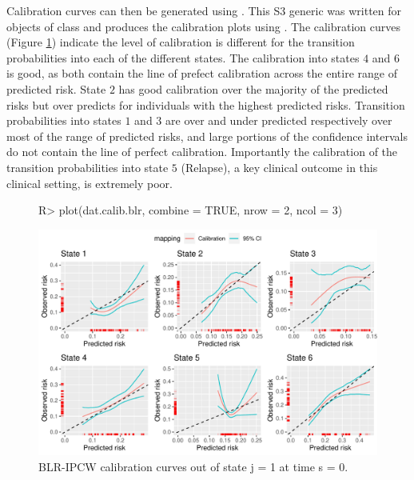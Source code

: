 \documentclass[article,shortnames]{jss}
\begin{document}
Calibration curves can then be generated using . This S3 generic was written for objects of class  and produces the calibration plots using . The calibration curves (Figure \ref{fig:blrj1s0}) indicate the level of calibration is different for the transition probabilities into each of the different states. The calibration into states $4$ and $6$ is good, as both contain the line of prefect calibration across the entire range of predicted risk. State $2$ has good calibration over the majority of the predicted risks but over predicts for individuals with the highest predicted risks. Transition probabilities into states $1$ and $3$ are over and under predicted respectively over most of the range of predicted risks, and large portions of the confidence intervals do not contain the line of perfect calibration. Importantly the calibration of the transition probabilities into state $5$ (Relapse), a key clinical outcome in this clinical setting, is extremely poor.

\begin{figure}[t!]
\centering
\begin{Schunk}
\begin{Sinput}
R> plot(dat.calib.blr, combine = TRUE, nrow = 2, ncol = 3)
\end{Sinput}
\end{Schunk}
\includegraphics{calibmsm-jss-TEST-006}
\caption{\label{fig:blrj1s0} BLR-IPCW calibration curves out of state j =  1 at time s = 0.}
\end{figure}
\end{document}
